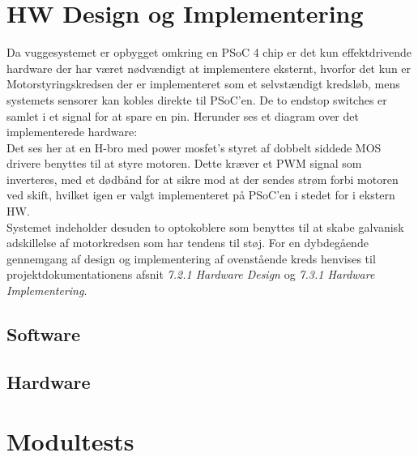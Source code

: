 



\section{HW Design og Implementering}
\label{vs_HW}
Da vuggesystemet er opbygget omkring en PSoC 4 chip er det kun effektdrivende hardware der har været nødvændigt at implementere eksternt, hvorfor det kun er Motorstyringskredsen der er implementeret som et selvstændigt kredsløb, mens systemets sensorer kan kobles direkte til PSoC'en. De to endstop switches er samlet i et signal for at spare en pin. Herunder ses et diagram over det implementerede hardware:\\
Det ses her at en H-bro med power mosfet's styret af dobbelt siddede MOS drivere benyttes til at styre motoren. Dette kræver et PWM signal som inverteres, med et dødbånd for at sikre mod at der sendes strøm forbi motoren ved skift, hvilket igen er valgt implementeret på PSoC'en i stedet for i ekstern HW. \\ Systemet indeholder desuden to optokoblere som benyttes til at skabe galvanisk adskillelse af motorkredsen som har tendens til støj.
For en dybdegående gennemgang af design og implementering af ovenstående kreds henvises til projektdokumentationens afsnit \textit{7.2.1 Hardware Design} og \textit{7.3.1 Hardware Implementering}.\\



\subsection*{Software}
\label{vs_implementering_sw}


\subsection*{Hardware}
\label{vs_implementering_hw}

\section{Modultests}
\label{vs_modultests}